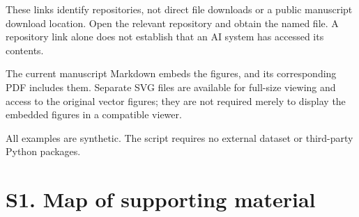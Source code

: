 \documentclass[
]{article}
\begin{document}
These links identify repositories, not direct file downloads or a public
manuscript download location. Open the relevant repository and obtain
the named file. A repository link alone does not establish that an AI
system has accessed its contents.

The current manuscript Markdown embeds the figures, and its
corresponding PDF includes them. Separate SVG files are available for
full-size viewing and access to the original vector figures; they are
not required merely to display the embedded figures in a compatible
viewer.

All examples are synthetic. The script requires no external dataset or
third-party Python packages.

\section{S1. Map of supporting
material}\label{s1.-map-of-supporting-material}
\end{document}
